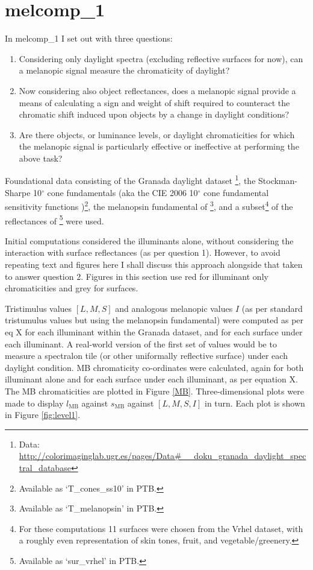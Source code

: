 \section{melcomp\_1}

In melcomp\_1 I set out with three questions:
\begin{enumerate}
\item Considering only daylight spectra (excluding reflective surfaces for now), can a melanopic signal measure the chromaticity of daylight? %
\item Now considering also object reflectances, does a melanopic signal provide a means of calculating a sign and weight of shift required to counteract the chromatic shift induced upon objects by a change in daylight conditions?
\item Are there objects, or luminance levels, or daylight chromaticities for which the melanopic signal is particularly effective or ineffective at performing the above task?
\end{enumerate}

Foundational data consisting of 
the Granada daylight dataset 
\citep{hernandez-andres_color_2001}\footnote{Data: \url{http://colorimaginglab.ugr.es/pages/Data\#__doku_granada_daylight_spectral_database}},
the Stockman-Sharpe 10$^{\circ}$ cone fundamentals 
\citep{stockman_spectral_2000,stockman_spectral_1999}
(aka the CIE 2006 10$^{\circ}$ cone fundamental sensitivity functions \cite{cie_cie_2006})\footnote{Available as `T\_cones\_ss10' in \gls{PTB}.},
the melanopsin fundamental of \citet{lucas_measuring_2014}\footnote{Available as `T\_melanopsin' in \gls{PTB}.},
and a subset\footnote{For these computations 11 surfaces were chosen from the Vrhel dataset, with a roughly even representation of skin tones, fruit, and vegetable/greenery.} 
of the reflectances of \citet{vrhel_measurement_1994}\footnote{Available as `sur\_vrhel' in \gls{PTB}.}
were used.

Initial computations considered the illuminants alone, without considering the interaction with surface reflectances (as per question 1). However, to avoid repeating text and figures here I shall discuss this approach alongside that taken to answer question 2. Figures in this section use red for illuminant only chromaticities and grey for surfaces. 

Tristimulus values $[L,M,S]$ and analogous melanopic values $I$ (as per standard tristumulus values but using the melanopsin fundamental) were computed as per eq X %
for each illuminant within the Granada dataset, and for each surface under each illuminant. A real-world version of the first set of values would be to measure a spectralon tile (or other uniformally reflective surface) under each daylight condition. \gls{MB} chromaticity co-ordinates were calculated, again for both illuminant alone and for each surface under each illuminant, as per equation X. %
The \gls{MB} chromaticities are plotted in Figure \ref{MB}. Three-dimensional plots were made to display $l_{\text{MB}}$ against $s_{\text{MB}}$ against $[L,M,S,I]$ in turn. Each plot is shown in Figure \ref{fig:level1}. 

